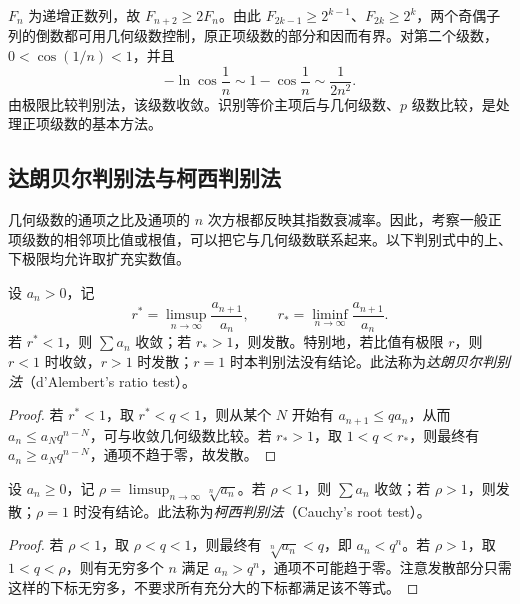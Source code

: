\documentclass[UTF8,12pt,a4paper,fontset=fandol]{ctexbook}
\begin{document}
\begin{solve}
$F_n$ 为递增正数列，故 $F_{n+2}\geq2F_n$。由此 $F_{2k-1}\geq2^{k-1}$、$F_{2k}\geq2^k$，两个奇偶子列的倒数都可用几何级数控制，原正项级数的部分和因而有界。对第二个级数，$0<\cos(1/n)<1$，并且
\[
    -\ln\cos\frac1n
    \sim1-\cos\frac1n\sim\frac1{2n^2}.
\]
由极限比较判别法，该级数收敛。识别等价主项后与几何级数、$p$ 级数比较，是处理正项级数的基本方法。
\end{solve}

\subsection{达朗贝尔判别法与柯西判别法}
\label{subsec:dalembert-and-cauchy-tests}

几何级数的通项之比及通项的 $n$ 次方根都反映其指数衰减率。因此，考察一般正项级数的相邻项比值或根值，可以把它与几何级数联系起来。以下判别式中的上、下极限均允许取扩充实数值。

\begin{theorem}[达朗贝尔比值判别法]
\label{thm:dalembert-ratio-test}
设 $a_n>0$，记
\[
    r^*=\limsup_{n\to\infty}\frac{a_{n+1}}{a_n},\qquad
    r_*=\liminf_{n\to\infty}\frac{a_{n+1}}{a_n}.
\]
若 $r^*<1$，则 $\sum a_n$ 收敛；若 $r_*>1$，则发散。特别地，若比值有极限 $r$，则 $r<1$ 时收敛，$r>1$ 时发散；$r=1$ 时本判别法没有结论。此法称为\emph{达朗贝尔判别法}（d'Alembert's ratio test）。
\end{theorem}

\begin{proof}
若 $r^*<1$，取 $r^*<q<1$，则从某个 $N$ 开始有 $a_{n+1}\leq qa_n$，从而 $a_n\leq a_Nq^{n-N}$，可与收敛几何级数比较。若 $r_*>1$，取 $1<q<r_*$，则最终有 $a_n\geq a_Nq^{n-N}$，通项不趋于零，故发散。
\end{proof}

\begin{theorem}[柯西根值判别法]
\label{thm:cauchy-root-test}
设 $a_n\geq0$，记 $\rho=\limsup_{n\to\infty}\sqrt[n]{a_n}$。若 $\rho<1$，则 $\sum a_n$ 收敛；若 $\rho>1$，则发散；$\rho=1$ 时没有结论。此法称为\emph{柯西判别法}（Cauchy's root test）。
\end{theorem}

\begin{proof}
若 $\rho<1$，取 $\rho<q<1$，则最终有 $\sqrt[n]{a_n}<q$，即 $a_n<q^n$。若 $\rho>1$，取 $1<q<\rho$，则有无穷多个 $n$ 满足 $a_n>q^n$，通项不可能趋于零。注意发散部分只需这样的下标无穷多，不要求所有充分大的下标都满足该不等式。
\end{proof}
\end{document}
